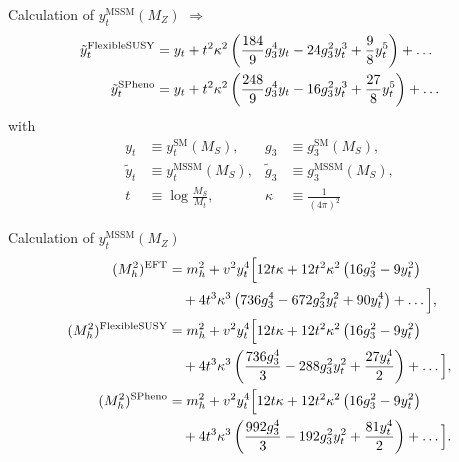 \documentclass[hyperref={pdfpagelabels=false},ngerman]{beamer}
\newcommand{\SM}{\ensuremath{\text{SM}}}
\begin{document}
\newcommand{\kappaL}{\kappa}

\begin{frame}[noframenumbering]{Calculation of $y_t^{\text{MSSM}}(M_Z)$}
  $\Rightarrow$
  \begin{align*}
    \ytMSSMhigh^{\text{\FS}} &= 
    \ythigh +
    t^2\kappaL^2 \left(\frac{184}{9} \gshigh^4 \ythigh -24 \gshigh^2
      \ythigh^3 
      +\frac{9}{8} \ythigh^5 \right) 
    +\ldots\\
    \ytMSSMhigh^{\text{\SPheno}} &= 
    \ythigh +
    t^2 \kappaL^2 \left(\frac{248}{9} \gshigh^4 \ythigh-16 \gshigh^2
      \ythigh^3
      +\frac{27}{8} \ythigh^5\right) 
    +\ldots
  \end{align*}
  with
  \begin{align*}
    y_t &\equiv y_t^\SM(M_S), & g_3 &\equiv g_3^\SM(M_S), \\
    \tilde{y}_t &\equiv y_t^\text{MSSM}(M_S), & \tilde{g}_3 &\equiv g_3^\text{MSSM}(M_S), \\
    t &\equiv \log\frac{M_S}{M_t}, & \kappaL &\equiv \frac{1}{(4 \pi)^2}
  \end{align*}
\end{frame}

\begin{frame}[noframenumbering]{Calculation of $y_t^{\text{MSSM}}(M_Z)$}
  \begin{align*}
    (M_h^2)^{\text{EFT}}&=
    m_h^2
    + \vhigh^2 
    \ythigh^4\Big[12 t \kappaL
    +12 t^2 \kappaL^2 
    \left(16 \gshigh^2 - 9\ythigh^2 \right)
    \\&\quad{}
    +
    4 t^3\kappaL^3  \left(736 \gshigh^4-672 \gshigh^2 \ythigh^2+90
      \ythigh^4\right) 
    +\ldots\Big],
    \\
    (M_h^2)^{\text{\FS}}&=
    m_h^2
    + \vhigh^2 
    \ythigh^4\Big[12 t \kappaL
    +12 t^2 \kappaL^2 
    \left(16 \gshigh^2 - 9\ythigh^2 \right)
    \\&\quad{}
    +4 t^3\kappaL^3 \left(\frac{736 \gshigh^4}{3}-288 \gshigh^2
      \ythigh^2+\frac{27 \ythigh^4}{2}\right)
    +\ldots\Big],
    \\
    (M_h^2)^{\text{\SPheno}}&=
    m_h^2
    + \vhigh^2 
    \ythigh^4\Big[12 t \kappaL
    +12 t^2 \kappaL^2 
    \left(16 \gshigh^2 - 9\ythigh^2 \right)
    \\&\quad{}
    +4 t^3\kappaL^3 \left(\frac{992 \gshigh^4}{3}-192 \gshigh^2
      \ythigh^2+\frac{81 \ythigh^4}{2}\right)
    +\ldots\Big].
  \end{align*}
\end{frame}
\end{document}
